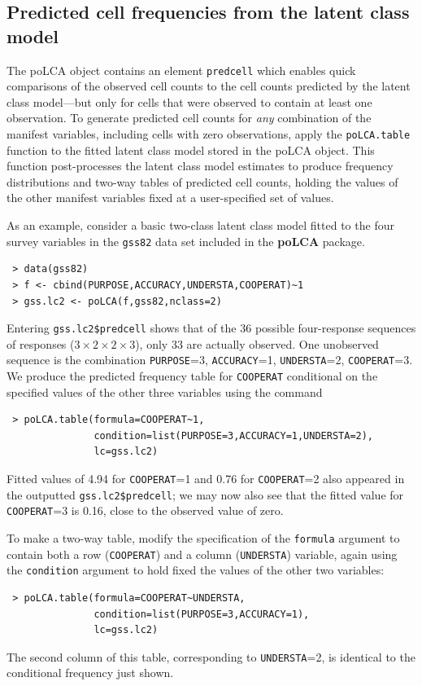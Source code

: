 \documentclass[letterpaper,12pt]{article}
\begin{document}
\subsection{Predicted cell frequencies from the latent class model} \label{s.predtable}

The poLCA object contains an element \texttt{predcell} which enables quick comparisons of the observed cell counts to the cell counts predicted by the latent class model---but only for cells that were observed to contain at least one observation.  To generate predicted cell counts for \emph{any} combination of the manifest variables, including cells with zero observations, apply the \texttt{poLCA.table} function to the fitted latent class model stored in the poLCA object.  This function post-processes the latent class model estimates to produce frequency distributions and two-way tables of predicted cell counts, holding the values of the other manifest variables fixed at a user-specified set of values.

As an example, consider a basic two-class latent class model fitted to the four survey variables in the \texttt{gss82} data set included in the \textbf{poLCA} package.
\begin{verbatim}
 > data(gss82)
 > f <- cbind(PURPOSE,ACCURACY,UNDERSTA,COOPERAT)~1
 > gss.lc2 <- poLCA(f,gss82,nclass=2)
\end{verbatim}
Entering \texttt{gss.lc2\$predcell} shows that of the 36 possible four-response sequences of responses ($3 \times 2 \times 2 \times 3$), only 33 are actually observed.  One unobserved sequence is the combination \texttt{PURPOSE}=3, \texttt{ACCURACY}=1, \texttt{UNDERSTA}=2, \texttt{COOPERAT}=3.  We produce the predicted frequency table for \texttt{COOPERAT} conditional on the specified values of the other three variables using the command
\begin{verbatim}
 > poLCA.table(formula=COOPERAT~1,
               condition=list(PURPOSE=3,ACCURACY=1,UNDERSTA=2),
               lc=gss.lc2)
\end{verbatim}
Fitted values of 4.94 for \texttt{COOPERAT}=1 and 0.76 for \texttt{COOPERAT}=2 also appeared in the outputted \texttt{gss.lc2\$predcell}; we may now also see that the fitted value for \texttt{COOPERAT}=3 is 0.16, close to the observed value of zero.

To make a two-way table, modify the specification of the \texttt{formula} argument to contain both a row (\texttt{COOPERAT}) and a column (\texttt{UNDERSTA}) variable, again using the \texttt{condition} argument to hold fixed the values of the other two variables:
\begin{verbatim}
 > poLCA.table(formula=COOPERAT~UNDERSTA,
               condition=list(PURPOSE=3,ACCURACY=1),
               lc=gss.lc2)
\end{verbatim}
The second column of this table, corresponding to \texttt{UNDERSTA}=2, is identical to the conditional frequency just shown.
\end{document}
